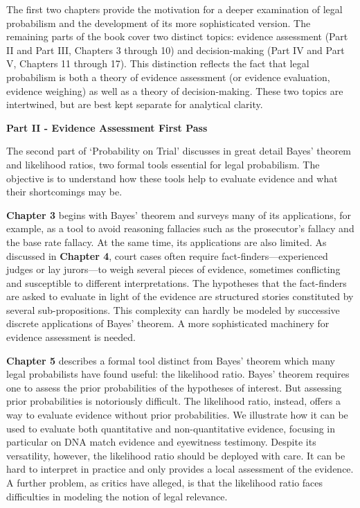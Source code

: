 \documentclass[
  10pt,
  dvipsnames,enabledeprecatedfontcommands]{scrartcl}
\begin{document}
The first two chapters provide the motivation for a deeper examination
of legal probabilism and the development of its more sophisticated
version. The remaining parts of the book cover two distinct topics:
evidence assessment (Part II and Part III, Chapters 3 through 10) and
decision-making (Part IV and Part V, Chapters 11 through 17). This
distinction reflects the fact that legal probabilism is both a theory of
evidence assessment (or evidence evaluation, evidence weighing) as well
as a theory of decision-making. These two topics are intertwined, but
are best kept separate for analytical clarity.

\vspace{3mm}

\noindent \textbf{Part II - Evidence Assessment First Pass}

\noindent The second part of `Probability on Trial' discusses in great
detail Bayes' theorem and likelihood ratios, two formal tools essential
for legal probabilism. The objective is to understand how these tools
help to evaluate evidence and what their shortcomings may be.

\textbf{Chapter 3} begins with Bayes' theorem and surveys many of its
applications, for example, as a tool to avoid reasoning fallacies such
as the prosecutor's fallacy and the base rate fallacy. At the same time,
its applications are also limited. As discussed in \textbf{Chapter 4},
court cases often require fact-finders---experienced judges or lay
jurors---to weigh several pieces of evidence, sometimes conflicting and
susceptible to different interpretations. The hypotheses that the
fact-finders are asked to evaluate in light of the evidence are
structured stories constituted by several sub-propositions. This
complexity can hardly be modeled by successive discrete applications of
Bayes' theorem. A more sophisticated machinery for evidence assessment
is needed.

\textbf{Chapter 5} describes a formal tool distinct from Bayes' theorem
which many legal probabilists have found useful: the likelihood ratio.
Bayes' theorem requires one to assess the prior probabilities of the
hypotheses of interest. But assessing prior probabilities is notoriously
difficult. The likelihood ratio, instead, offers a way to evaluate
evidence without prior probabilities. We illustrate how it can be used
to evaluate both quantitative and non-quantitative evidence, focusing in
particular on DNA match evidence and eyewitness testimony. Despite its
versatility, however, the likelihood ratio should be deployed with care.
It can be hard to interpret in practice and only provides a local
assessment of the evidence. A further problem, as critics have alleged,
is that the likelihood ratio faces difficulties in modeling the notion
of legal relevance.
\end{document}
